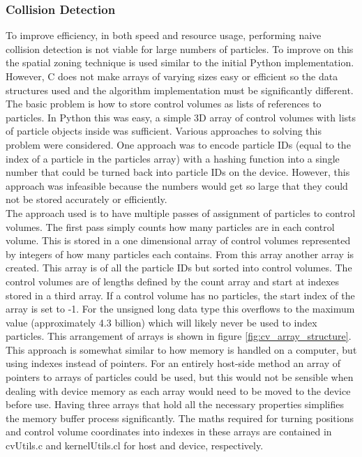 \documentclass[10pt,a4paper,titlepage]{report}
\begin{document}
\subsubsection{Collision Detection}
\label{sec:OpenCL Collision Detection}
To improve efficiency, in both speed and resource usage, performing naive collision detection is not viable for large numbers of particles. To improve on this the spatial zoning technique is used similar to the initial Python implementation. However, C does not make arrays of varying sizes easy or efficient so the data structures used and the algorithm implementation must be significantly different.
\\The basic problem is how to store control volumes as lists of references to particles. In Python this was easy, a simple 3D array of control volumes with lists of particle objects inside was sufficient. Various approaches to solving this problem were considered. One approach was to encode particle IDs (equal to the index of a particle in the particles array) with a hashing function into a single number that could be turned back into particle IDs on the device. However, this approach was infeasible because the numbers would get so large that they could not be stored accurately or efficiently.
\\The approach used is to have multiple passes of assignment of particles to control volumes. The first pass simply counts how many particles are in each control volume. This is stored in a one dimensional array of control volumes represented by integers of how many particles each contains. From this array another array is created. This array is of all the particle IDs but sorted into control volumes. The control volumes are of lengths defined by the count array and start at indexes stored in a third array. If a control volume has no particles, the start index of the array is set to -1. For the unsigned long data type this overflows to the maximum value (approximately 4.3 billion) which will likely never be used to index particles. This arrangement of arrays is shown in figure \ref{fig:cv_array_structure}.
\\This approach is somewhat similar to how memory is handled on a computer, but using indexes instead of pointers. For an entirely host-side method an array of pointers to arrays of particles could be used, but this would not be sensible when dealing with device memory as each array would need to be moved to the device before use. Having three arrays that hold all the necessary properties simplifies the memory buffer process significantly. The maths required for turning positions and control volume coordinates into indexes in these arrays are contained in cvUtils.c and kernelUtils.cl for host and device, respectively.
\end{document}
